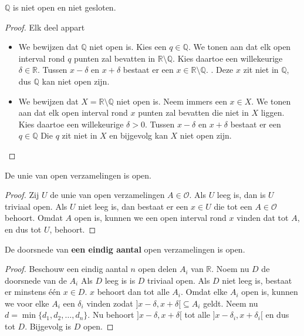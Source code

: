 \documentclass[main.tex]{subfiles}
\begin{document}
\begin{st}
  $\mathbb{Q}$ is niet open en niet gesloten.

  \begin{proof}
    Elk deel appart
    \begin{itemize}
    \item We bewijzen dat $\mathbb{Q}$ niet open is.
      Kies een $q \in \mathbb{Q}$.
      We tonen aan dat elk open interval rond $q$ punten zal bevatten in $\mathbb{R}\setminus\mathbb{Q}$.
      Kies daartoe een willekeurige $\delta \in \mathbb{R}$.
      Tussen $x-\delta$ en $x+\delta$ bestaat er een $x\in \mathbb{R}\setminus\mathbb{Q}$.\needed
      .
      Deze $x$ zit niet in $\mathbb{Q}$, dus $\mathbb{Q}$ kan niet open zijn.
    \item We bewijzen dat $X=\mathbb{R}\setminus \mathbb{Q}$ niet open is.
      Neem immers een $x\in X$.
      We tonen aan dat elk open interval rond $x$ punten zal bevatten die niet in $X$ liggen.
      Kies daartoe een willekeurige $\delta > 0$.
      Tussen $x-\delta$ en $x+\delta$ bestaat er een $q\in \mathbb{Q}$
      Die $q$ zit niet in $X$ en bijgevolg kan $X$ niet open zijn.
    \end{itemize}
  \end{proof}
\end{st}

\begin{pr}
  \label{pr:unie-open-verzamelingen-open}
  De unie van open verzamelingen is open.

  \begin{proof}
    Zij $U$ de unie van open verzamelingen $A\in \mathcal{O}$.
    Als $U$ leeg is, dan is $U$ triviaal open.
    Als $U$ niet leeg is, dan bestaat er een $x\in U$ die tot een $A \in \mathcal{O}$ behoort.
    Omdat $A$ open is, kunnen we een open interval rond $x$ vinden dat tot $A$, en dus tot $U$, behoort.
  \end{proof}
\end{pr}

\begin{pr}
  \label{pr:eindige-doorsnede-open-verzamelingen-open}
  De doorsnede van \textbf{een eindig aantal} open verzamelingen is open.

  \begin{proof}
    Beschouw een eindig aantal $n$ open delen $A_{i}$ van $\mathbb{R}$.
    Noem nu $D$ de doorsnede van de $A_{i}$
    Als $D$ leeg is is $D$ triviaal open.
    Als $D$ niet leeg is, bestaat er minstens \'e\'en $x\in D$.
    $x$ behoort dan tot alle $A_{i}$.
    Omdat elke $A_{i}$ open is, kunnen we voor elke $A_{i}$ een $\delta_{i}$ vinden zodat $]x-\delta,x+\delta[ \subseteq A_{i}$ geldt.
    Neem nu $d = \min\{ d_{1}, d_{2},\dotsc, d_{n}\}$.
    Nu behoort $]x-\delta,x+\delta[$ tot alle $]x-\delta_{i},x+\delta_{i}[$ en dus tot $D$.
    Bijgevolg is $D$ open.
  \end{proof}
\end{pr}
\end{document}
